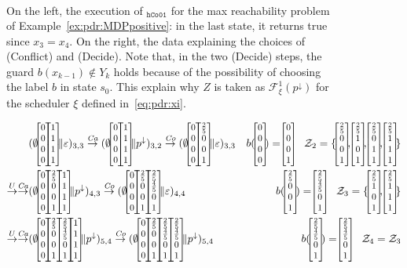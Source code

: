 \begin{example}
\begin{figure}[t]
{\begin{align*}
			\end{align*}
		}
		\caption{On the left, the execution of {\ADPDR}$_{\texttt{hCo01}}$ for the max reachability problem of Example~\ref{ex:pdr:MDPpositive}: in the last state, it returns true since $x_3=x_4$. On the right, the data explaining the choices of (Conflict) and (Decide). Note that, in the two (Decide) steps, the guard $b(x_{k-1}) \notin Y_k$ holds because of the possibility of choosing the label $b$ in state $s_0$. This explain why  $Z$  is taken as $\mathcal{F}^1_\xi(p^{\downarrow})$ for the scheduler $\xi$ defined in~\eqref{eq:pdr:xi}.}
		\label{fig:pdr:exgen}
	\end{figure}

	\begin{figure}[t]
		{\footnotesize
			\begin{align*}
				                                                                                                                                                                                    & (\emptyset\cvec{0}{0}{0}{0}\cvec{1}{1}{1}{1} \| \varepsilon)_{3,3}
				\tr{\mathit{Ca}} (\emptyset\cvec{0}{0}{0}{0}\cvec{1}{1}{1}{1} \| p^\downarrow )_{3,2} \tr{\mathit{Co}} (\emptyset\cvec{0}{0}{0}{0}\cvec{\frac{2}{5}}{0}{0}{1} \| \varepsilon)_{3,3} & { b(\cvec{0}{0}{0}{0})=\cvec{0}{0}{0}{1} \quad \mathcal{Z}_2 = \{\cvec{\frac{2}{5}}{0}{0}{1}, \cvec{\frac{2}{5}}{1}{0}{1},\cvec{\frac{2}{5}}{0}{1}{1}, \cvec{\frac{2}{5}}{1}{1}{1} \}  }                                                                                                                                                                                                                                                                                           \\
				\tr{U}  \tr{\mathit{Ca}}                                                                                                                                                            & (\emptyset\cvec{0}{0}{0}{0}\cvec{\frac{2}{5}}{0}{0}{1} \cvec{1}{1}{1}{1}\| p^\downarrow)_{4,3} \tr{\mathit{Co}}  (\emptyset\cvec{0}{0}{0}{0}\cvec{\frac{2}{5}}{0}{0}{1} \cvec{\frac{2}{5}}{\frac{4}{5}}{0}{1} \| \varepsilon)_{4,4}                                                                                & {b(\cvec{\frac{2}{5}}{0}{0}{1})= \cvec{\frac{2}{5}}{\frac{4}{5}}{0}{1} \quad \mathcal{Z}_3 = \{ \cvec{\frac{2}{5}}{1}{0}{1}, \cvec{\frac{2}{5}}{1}{1}{1} \} } \\
				\tr{U} \tr{\mathit{Ca}}                                                                                                                                                             & (\emptyset\cvec{0}{0}{0}{0}\cvec{\frac{2}{5}}{0}{0}{1} \cvec{\frac{2}{5}}{\frac{4}{5}}{0}{1} \cvec{1}{1}{1}{1} \| p^\downarrow)_{5,4}  \tr{\mathit{Co}}  (\emptyset\cvec{0}{0}{0}{0}\cvec{\frac{2}{5}}{0}{0}{1} \cvec{\frac{2}{5}}{\frac{4}{5}}{0}{1} \cvec{\frac{2}{5}}{\frac{4}{5}}{0}{1} \| p^\downarrow)_{5,4} & {b(\cvec{\frac{2}{5}}{\frac{4}{5}}{0}{1})= \cvec{\frac{2}{5}}{\frac{4}{5}}{0}{1} \quad \mathcal{Z}_4 = \mathcal{Z}_3 }

\end{align*}}
\end{figure}
\end{example}
